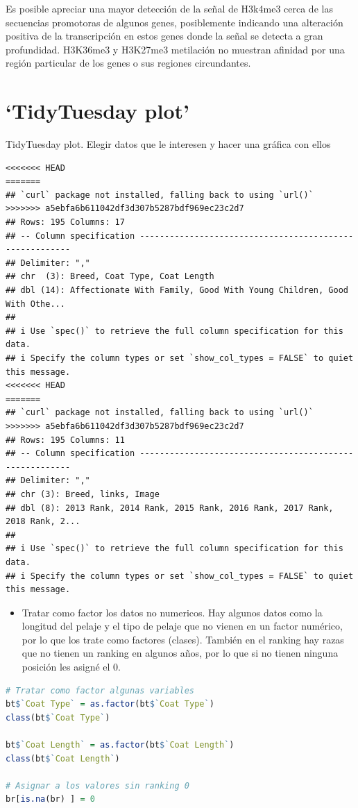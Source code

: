 \documentclass[
]{article}
\providecommand{\tightlist}{%
  \setlength{\itemsep}{0pt}\setlength{\parskip}{0pt}}
\begin{document}
Es posible apreciar una mayor detección de la señal de H3k4me3 cerca de
las secuencias promotoras de algunos genes, posiblemente indicando una
alteración positiva de la transcripción en estos genes donde la señal se
detecta a gran profundidad. H3K36me3 y H3K27me3 metilación no muestran
afinidad por una región particular de los genes o sus regiones
circundantes.

\hypertarget{tidytuesday-plot}{%
\section{`TidyTuesday plot'}\label{tidytuesday-plot}}

TidyTuesday plot. Elegir datos que le interesen y hacer una gráfica con
ellos

\begin{lstlisting}
<<<<<<< HEAD
=======
## `curl` package not installed, falling back to using `url()`
>>>>>>> a5ebfa6b611042df3d307b5287bdf969ec23c2d7
## Rows: 195 Columns: 17
## -- Column specification --------------------------------------------------------
## Delimiter: ","
## chr  (3): Breed, Coat Type, Coat Length
## dbl (14): Affectionate With Family, Good With Young Children, Good With Othe...
## 
## i Use `spec()` to retrieve the full column specification for this data.
## i Specify the column types or set `show_col_types = FALSE` to quiet this message.
<<<<<<< HEAD
=======
## `curl` package not installed, falling back to using `url()`
>>>>>>> a5ebfa6b611042df3d307b5287bdf969ec23c2d7
## Rows: 195 Columns: 11
## -- Column specification --------------------------------------------------------
## Delimiter: ","
## chr (3): Breed, links, Image
## dbl (8): 2013 Rank, 2014 Rank, 2015 Rank, 2016 Rank, 2017 Rank, 2018 Rank, 2...
## 
## i Use `spec()` to retrieve the full column specification for this data.
## i Specify the column types or set `show_col_types = FALSE` to quiet this message.
\end{lstlisting}

\begin{itemize}
\tightlist
\item
  Tratar como factor los datos no numericos. Hay algunos datos como la
  longitud del pelaje y el tipo de pelaje que no vienen en un factor
  numérico, por lo que los trate como factores (clases). También en el
  ranking hay razas que no tienen un ranking en algunos años, por lo que
  si no tienen ninguna posición les asigné el 0.
\end{itemize}

\begin{lstlisting}[language=R]
# Tratar como factor algunas variables
bt$`Coat Type` = as.factor(bt$`Coat Type`)
class(bt$`Coat Type`)

bt$`Coat Length` = as.factor(bt$`Coat Length`)
class(bt$`Coat Length`)

# Asignar a los valores sin ranking 0
br[is.na(br) ] = 0
\end{lstlisting}
\end{document}
